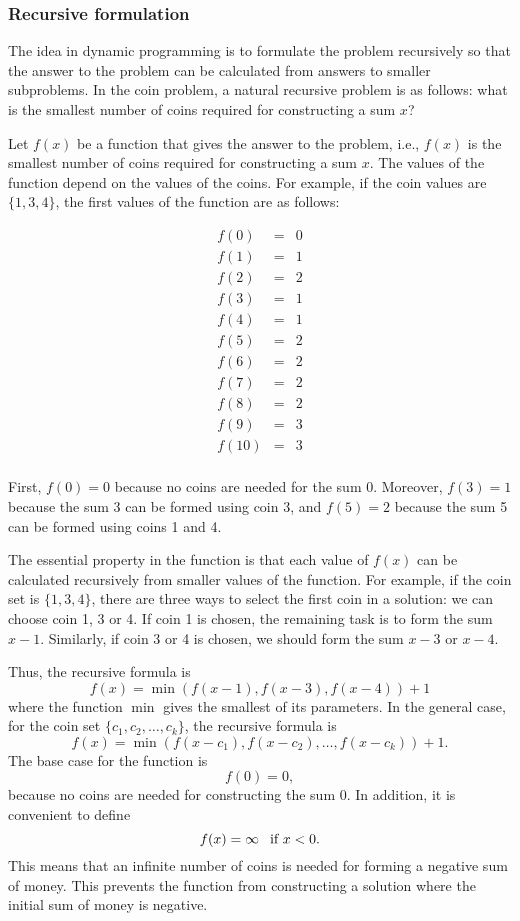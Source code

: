 \subsubsection{Recursive formulation}

The idea in dynamic programming is to
formulate the problem recursively so
that the answer to the problem can be
calculated from answers to smaller
subproblems.
In the coin problem, a natural recursive
problem is as follows:
what is the smallest number of coins
required for constructing a sum $x$?

Let $f(x)$ be a function that gives the answer
to the problem, i.e., $f(x)$ is the smallest
number of coins required for constructing a sum $x$.
The values of the function depend on the
values of the coins.
For example, if the coin values are $\{1,3,4\}$,
the first values of the function are as follows:

\[
\begin{array}{lcl}
f(0) & = & 0 \\
f(1) & = & 1 \\
f(2) & = & 2 \\
f(3) & = & 1 \\
f(4) & = & 1 \\
f(5) & = & 2 \\
f(6) & = & 2 \\
f(7) & = & 2 \\
f(8) & = & 2 \\
f(9) & = & 3 \\
f(10) & = & 3 \\
\end{array}
\]

First, $f(0)=0$ because no coins are needed
for the sum $0$.
Moreover, $f(3)=1$ because the sum $3$
can be formed using coin 3,
and $f(5)=2$ because the sum 5 can
be formed using coins 1 and 4.

The essential property in the function is
that each value of $f(x)$ can be calculated
recursively from smaller values of the function.
For example, if the coin set is $\{1,3,4\}$,
there are three ways to select the first coin
in a solution: we can choose coin 1, 3 or 4.
If coin 1 is chosen, the remaining task is to
form the sum $x-1$.
Similarly, if coin 3 or 4 is chosen,
we should form the sum $x-3$ or $x-4$.

Thus, the recursive formula is
\[f(x) = \min(f(x-1),f(x-3),f(x-4))+1\]
where the function $\min$ gives the smallest
of its parameters.
In the general case, for the coin set
$\{c_1,c_2,\ldots,c_k\}$,
the recursive formula is
\[f(x) = \min(f(x-c_1),f(x-c_2),\ldots,f(x-c_k))+1.\]
The base case for the function is
\[f(0)=0,\]
because no coins are needed for constructing
the sum 0.
In addition, it is convenient to define
\[f(x)=\infty\hspace{8px}\textrm{if $x<0$}.\]
This means that an infinite number of coins
is needed for forming a negative sum of money.
This prevents the function from constructing
a solution where the initial sum of money is negative.

